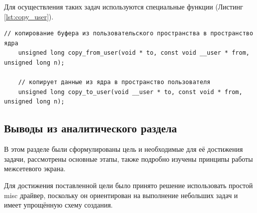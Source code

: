 Для осуществления таких задач используются специальные функции (Листинг \ref{lst:copy_user}).

\begin{lstlisting}[caption = {Специальные функции}, label=lst:copy_user]
	// копирование буфера из пользовательского пространства в пространство ядра
	unsigned long copy_from_user(void * to, const void __user * from, unsigned long n);
	
	// копирует данные из ядра в пространство пользователя
	unsigned long copy_to_user(void __user * to, const void * from, unsigned long n);
\end{lstlisting}

\subsection{Выводы из аналитического раздела}
В этом разделе были сформулированы цель и необходимые для её достижения задачи, рассмотрены основные этапы, также подробно изучены принципы работы межсетевого экрана. 

Для достижения поставленной цели было принято решение использовать простой misc драйвер, поскольку он ориентирован на выполнение небольших задач и имеет упрощённую схему создания.


 